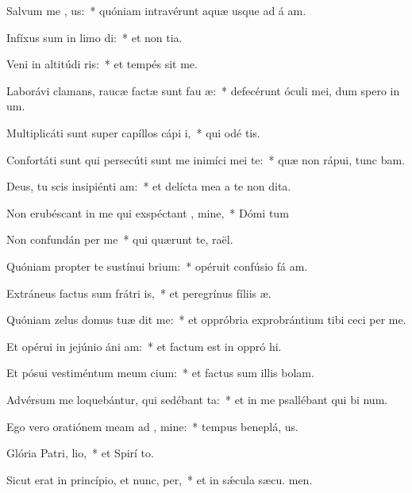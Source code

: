 \item Salvum me , us:~* quóniam intravérunt aquæ usque ad á am.
\item Infíxus sum in limo di:~* et non  tia.
\item Veni in altitúdi ris:~* et tempés sit me.
\item Laborávi clamans, raucæ factæ sunt fau æ:~* defecérunt óculi mei, dum spero in  um.
\item Multiplicáti sunt super capíllos cápi i,~* qui odé  tis.
\item Confortáti sunt qui persecúti sunt me inimíci mei te:~* quæ non rápui, tunc bam.
\item Deus, tu scis insipiénti am:~* et delícta mea a te non  dita.
\item Non erubéscant in me qui exspéctant , mine,~* Dómi tum
\item Non confundán per me~* qui quærunt te,  raël.
\item Quóniam propter te sustínui brium:~* opéruit confúsio fá am.
\item Extráneus factus sum frátri is,~* et peregrínus fíliis  æ.
\item Quóniam zelus domus tuæ dit me:~* et oppróbria exprobrántium tibi ceci per me.
\item Et opérui in jejúnio áni am:~* et factum est in oppró hi.
\item Et pósui vestiméntum meum cium:~* et factus sum illis  bolam.
\item Advérsum me loquebántur, qui sedébant  ta:~* et in me psallébant qui bi num.
\item Ego vero oratiónem meam ad , mine:~* tempus beneplá, us.
\item Glória Patri,  lio,~* et Spirí to.
\item Sicut erat in princípio, et nunc,  per,~* et in sǽcula sæcu. men.
